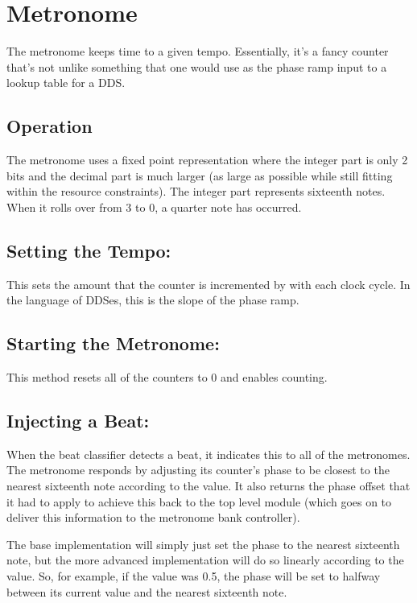 \documentclass[letterpaper]{article}
\begin{document}
\section{Metronome}

    The metronome keeps time to a given tempo.  Essentially, it's a fancy
    counter that's not unlike something that one would use as the phase ramp
    input to a lookup table for a DDS.

    \subsection{Operation}

    The metronome uses a fixed point representation where the integer part is
    only 2 bits and the decimal part is much larger (as large as possible while
    still fitting within the resource constraints).  The integer part
    represents sixteenth notes.  When it rolls over from 3 to 0, a quarter note
    has occurred.


    \subsection{Setting the Tempo: }

    This sets the amount that the counter is incremented by with each clock
    cycle.  In the language of DDSes, this is the slope of the phase ramp.


    \subsection{Starting the Metronome: }

    This method resets all of the counters to 0 and enables counting.


    \subsection{Injecting a Beat: }
    
    When the beat classifier detects a beat, it indicates this to all of the
    metronomes.  The metronome responds by adjusting its counter's phase to be
    closest to the nearest sixteenth note according to the 
    value.  It also returns the phase offset that it had to apply to achieve
    this back to the top level module (which goes on to deliver this
    information to the metronome bank controller).

    The base implementation will simply just set the phase to the nearest
    sixteenth note, but the more advanced implementation will do so linearly
    according to the  value.  So, for example, if the value
    was 0.5, the phase will be set to halfway between its current value and the
    nearest sixteenth note.
\end{document}
